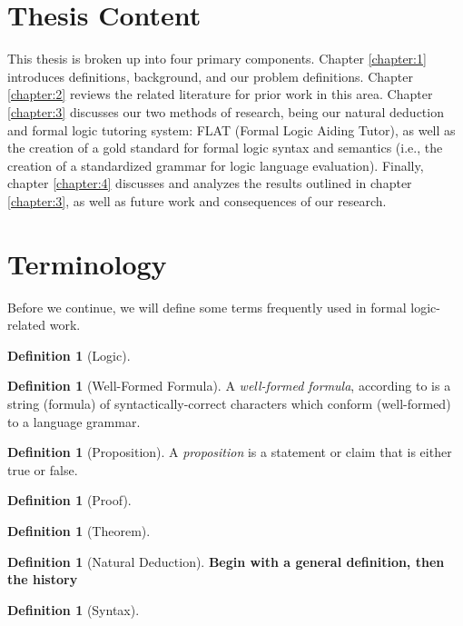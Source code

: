 \documentclass[ms]{uncgdissertationexp2}
\theoremstyle{plain}
\theoremstyle{definition}
\newtheorem{definition}[theorem]{Definition}
\theoremstyle{remark}
\begin{document}
\section{Thesis Content}
This thesis is broken up into four primary components. Chapter \ref{chapter:1} introduces definitions, background, and our problem definitions. Chapter \ref{chapter:2} reviews the related literature for prior work in this area. Chapter \ref{chapter:3} discusses our two methods of research, being our natural deduction and formal logic tutoring system: FLAT (Formal Logic Aiding Tutor), as well as the creation of a gold standard for formal logic syntax and semantics (i.e., the creation of a standardized grammar for logic language evaluation). Finally, chapter \ref{chapter:4} discusses and analyzes the results outlined in chapter \ref{chapter:3}, as well as future work and consequences of our research.
\section{Terminology}
Before we continue, we will define some terms frequently used in formal logic-related work.
\begin{definition}[Logic]

\end{definition}

\begin{definition}[Well-Formed Formula]
	A \textit{well-formed formula}, according to \cite{encyclopedia} is a string (formula) of syntactically-correct characters which conform (well-formed) to a language grammar.
\end{definition}
    
\begin{definition}[Proposition]
	A \textit{proposition} is a statement or claim that is either true or false.
\end{definition}

\begin{definition}[Proof]
\end{definition}
    
\begin{definition}[Theorem]
\end{definition}

\begin{definition}[Natural Deduction]
	\textbf{Begin with a general definition, then the history}
\end{definition}

\begin{definition}[Syntax]
\end{definition}
\end{document}
